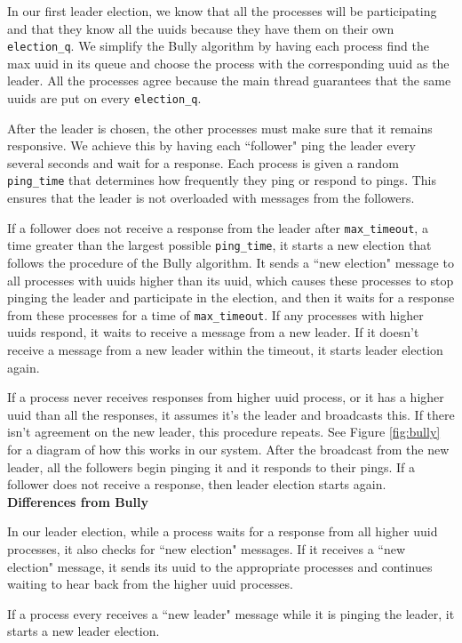 \documentclass[preprint,review,12pt]{cs262}
\begin{document}
In our first leader election, we know that all the processes will be participating and that they know all the uuids because they have them on their own \texttt{election\_q}. We simplify the Bully algorithm by having each process find the max uuid in its queue and choose the process with the corresponding uuid as the leader. All the processes agree because the main thread guarantees that the same uuids are put on every \texttt{election\_q}.

After the leader is chosen, the other processes must make sure that it remains responsive. We achieve this by having each ``follower" ping the leader every several seconds and wait for a response. Each process is given a random \texttt{ping\_time} that determines how frequently they ping or respond to pings. This ensures that the leader is not overloaded with messages from the followers.

If a follower does not receive a response from the leader after \texttt{max\_timeout}, a time greater than the largest possible \texttt{ping\_time}, it starts a new election that follows the procedure of the Bully algorithm. It sends a ``new election" message to all processes with uuids higher than its uuid, which causes these processes to stop pinging the leader and participate in the election, and then it waits for a response from these processes for a time of \texttt{max\_timeout}. If any processes with higher uuids respond, it waits to receive a message from a new leader. If it doesn't receive a message from a new leader within the timeout, it starts leader election again. 

If a process never receives responses from higher uuid process, or it has a higher uuid than all the responses, it assumes it's the leader and broadcasts this. If there isn't agreement on the new leader, this procedure repeats. See Figure \ref{fig:bully} for a diagram of how this works in our system. After the broadcast from the new leader, all the followers begin pinging it and it responds to their pings. If a follower does not receive a response, then leader election starts again.\\ \textbf{Differences from Bully}

In our leader election, while a process waits for a response from all higher uuid processes, it also checks for ``new election" messages. If it receives a ``new election" message, it sends its uuid to the appropriate processes and continues waiting to hear back from the higher uuid processes.

If a process every receives a ``new leader" message while it is pinging the leader, it starts a new leader election.
\end{document}
